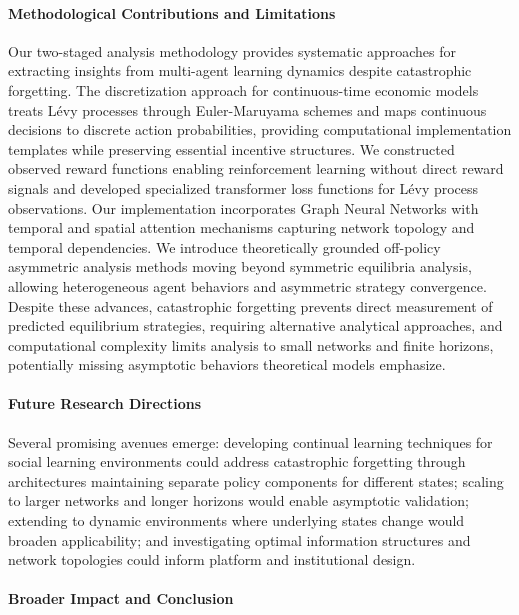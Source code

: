\paragraph{Methodological Contributions and Limitations}

Our two-staged analysis methodology provides systematic approaches for extracting insights from multi-agent learning dynamics despite catastrophic forgetting. The discretization approach for continuous-time economic models treats Lévy processes through Euler-Maruyama schemes and maps continuous decisions to discrete action probabilities, providing computational implementation templates while preserving essential incentive structures. We constructed observed reward functions enabling reinforcement learning without direct reward signals and developed specialized transformer loss functions for Lévy process observations. Our implementation incorporates Graph Neural Networks with temporal and spatial attention mechanisms capturing network topology and temporal dependencies. We introduce theoretically grounded off-policy asymmetric analysis methods moving beyond symmetric equilibria analysis, allowing heterogeneous agent behaviors and asymmetric strategy convergence. Despite these advances, catastrophic forgetting prevents direct measurement of predicted equilibrium strategies, requiring alternative analytical approaches, and computational complexity limits analysis to small networks and finite horizons, potentially missing asymptotic behaviors theoretical models emphasize.

\paragraph{Future Research Directions}

Several promising avenues emerge: developing continual learning techniques for social learning environments could address catastrophic forgetting through architectures maintaining separate policy components for different states; scaling to larger networks and longer horizons would enable asymptotic validation; extending to dynamic environments where underlying states change would broaden applicability; and investigating optimal information structures and network topologies could inform platform and institutional design.

\paragraph{Broader Impact and Conclusion}


